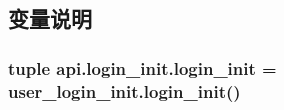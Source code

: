 \subsection{变量说明}
\hypertarget{namespaceapi_1_1login__init_adf1489612dedacaa5ab9429855c5f4cd}{
\subsubsection[{login\-\_\-init}]{\setlength{\rightskip}{0pt plus 5cm}tuple api.\-login\-\_\-init.\-login\-\_\-init = user\-\_\-login\-\_\-init.\-login\-\_\-init()}}\label{namespaceapi_1_1login__init_adf1489612dedacaa5ab9429855c5f4cd}

